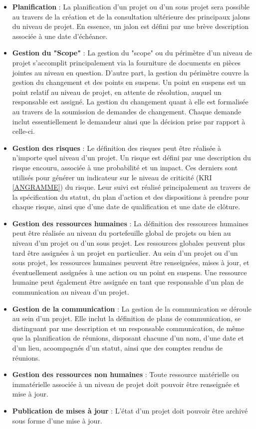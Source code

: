 \begin{spacing}{1.5}
\begin{itemize}
    \item \textbf{Planification} : La planification d'un projet ou d'un sous projet sera possible au travers de la création et de la consultation ultérieure des principaux jalons du niveau de projet. En essence, un jalon est défini par une brève description associée à une date d'échéance.
    \item \textbf{Gestion du "Scope"} : La gestion du "scope" ou du périmètre d'un niveau de projet s'accomplit principalement via la fourniture de documents en pièces jointes au niveau en question. D'autre part, la gestion du périmètre couvre la gestion du changement et des points en suspens. Un point en suspens est un point relatif au niveau de projet, en attente de résolution, auquel un responsable est assigné. La gestion du changement quant à elle est formalisée au travers de la soumission de demandes de changement. Chaque demande inclut essentiellement le demandeur ainsi que la décision prise par rapport à celle-ci.
    \item \textbf{Gestion des risques} : Le définition des risques peut être réalisée à n'importe quel niveau d'un projet. Un risque est défini par une description du risque encouru, associée à une probabilité et un impact. Ces derniers sont utilisés pour générer un indicateur sur le niveau de criticité (KRI \ref{ANGRAMME}) du risque. Leur suivi est réalisé principalement au travers de la spécification du statut, du plan d'action et des dispositions à prendre pour chaque risque, ainsi que d'une date de qualification et une date de clôture.
    \item \textbf{Gestion des ressources humaines} : La définition des ressources humaines peut être réalisée au niveau du portefeuille global de projets ou bien au niveau d'un projet ou d'un sous projet. Les ressources globales peuvent plus tard être assignées à un projet en particulier. Au sein d'un projet ou d'un sous projet, les ressources humaines peuvent être renseignées, mises à jour, et éventuellement assignées à une action ou un point en suspens. Une ressource humaine peut également être assignée en tant que responsable d'un plan de communication au niveau d'un projet.
    \item \textbf{Gestion de la communication} : La gestion de la communication se déroule au sein d'un projet. Elle inclut la définition de plans de communication, se distinguant par une description et un responsable communication, de même que la planification de réunions, disposant chacune d'un nom, d'une date et d'un lieu, acoompagnés d'un statut, ainsi que des comptes rendus de réunions.
    \item \textbf{Gestion des ressources non humaines} : Toute ressource matérielle ou immatérielle associée à un niveau de projet doit pouvoir être renseignée et mise à jour.
    \item \textbf{Publication de mises à jour} : L'état d'un projet doit pouvoir être archivé sous forme d'une mise à jour.
\end{itemize}
\


\end{spacing}
